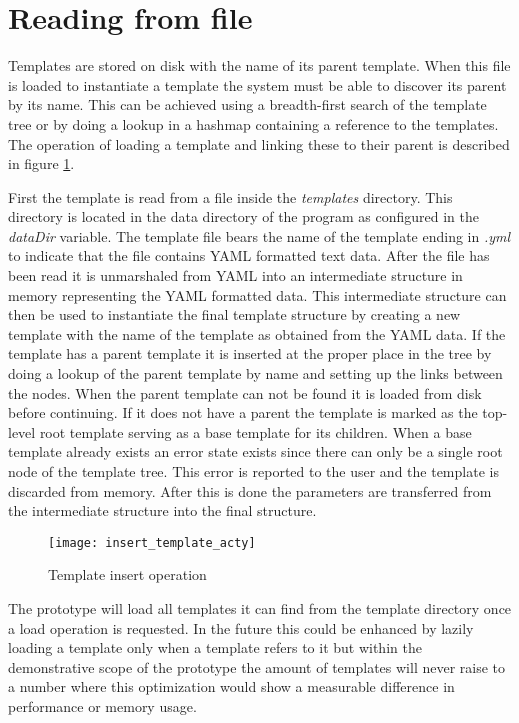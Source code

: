 \section{Reading from file}
Templates are stored on disk with the name of its parent template.
When this file is loaded to instantiate a template the system must be able to discover its parent by its name.
This can be achieved using a breadth-first search of the template tree or by doing a lookup in a hashmap containing a reference to the templates.
The operation of loading a template and linking these to their parent is described in figure \ref{fig:inserttemplate}.

First the template is read from a file inside the \emph{templates} directory.
This directory is located in the data directory of the program as configured in the \emph{dataDir} variable.
The template file bears the name of the template ending in \emph{.yml} to indicate that the file contains YAML formatted text data.
After the file has been read it is unmarshaled from YAML into an intermediate structure in memory representing the YAML formatted data.
This intermediate structure can then be used to instantiate the final template structure by creating a new template with the name of the template as obtained from the YAML data.
If the template has a parent template it is inserted at the proper place in the tree by doing a lookup of the parent template by name and setting up the links between the nodes.
When the parent template can not be found it is loaded from disk before continuing.
If it does not have a parent the template is marked as the top-level root template serving as a base template for its children.
When a base template already exists an error state exists since there can only be a single root node of the template tree.
This error is reported to the user and the template is discarded from memory.
After this is done the parameters are transferred from the intermediate structure into the final structure.

\begin{figure}[h!]
	\centering
	\texttt{[image: insert\_template\_acty]}
	\caption{Template insert operation}
	\label{fig:inserttemplate}
\end{figure}

The prototype will load all templates it can find from the template directory once a load operation is requested.
In the future this could be enhanced by lazily loading a template only when a template refers to it but within the demonstrative scope of the prototype the amount of templates will never raise to a number where this optimization would show a measurable difference in performance or memory usage.

